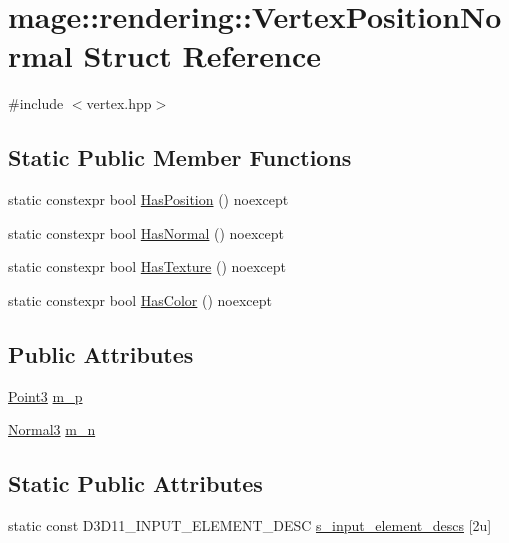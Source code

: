 \hypertarget{structmage_1_1rendering_1_1_vertex_position_normal}{}\section{mage\+:\+:rendering\+:\+:Vertex\+Position\+Normal Struct Reference}
\label{structmage_1_1rendering_1_1_vertex_position_normal}


{\ttfamily \#include $<$vertex.\+hpp$>$}

\subsection*{Static Public Member Functions}
\begin{DoxyCompactItemize}
\item 
static constexpr bool \mbox{\hyperlink{structmage_1_1rendering_1_1_vertex_position_normal_a90efd74233b76b071a322d737caf3abf}{Has\+Position}} () noexcept
\item 
static constexpr bool \mbox{\hyperlink{structmage_1_1rendering_1_1_vertex_position_normal_af5a32a3e51ce13c36b665f83f40209b6}{Has\+Normal}} () noexcept
\item 
static constexpr bool \mbox{\hyperlink{structmage_1_1rendering_1_1_vertex_position_normal_a40b091a64d0b5b2c2a07b382cd546589}{Has\+Texture}} () noexcept
\item 
static constexpr bool \mbox{\hyperlink{structmage_1_1rendering_1_1_vertex_position_normal_aead42377c86418475bb7b4c93398cd34}{Has\+Color}} () noexcept
\end{DoxyCompactItemize}
\subsection*{Public Attributes}
\begin{DoxyCompactItemize}
\item 
\mbox{\hyperlink{structmage_1_1_point3}{Point3}} \mbox{\hyperlink{structmage_1_1rendering_1_1_vertex_position_normal_a14824f61c8740e3472fccff1e3678515}{m\+\_\+p}}
\item 
\mbox{\hyperlink{structmage_1_1_normal3}{Normal3}} \mbox{\hyperlink{structmage_1_1rendering_1_1_vertex_position_normal_a5955e74eca6ef6c7516e6664370f8598}{m\+\_\+n}}
\end{DoxyCompactItemize}
\subsection*{Static Public Attributes}
\begin{DoxyCompactItemize}
\item 
static const D3\+D11\+\_\+\+I\+N\+P\+U\+T\+\_\+\+E\+L\+E\+M\+E\+N\+T\+\_\+\+D\+E\+SC \mbox{\hyperlink{structmage_1_1rendering_1_1_vertex_position_normal_a15116a834c4065e277de0e7d4299fee0}{s\+\_\+input\+\_\+element\+\_\+descs}} \mbox{[}2u\mbox{]}
\end{DoxyCompactItemize}


